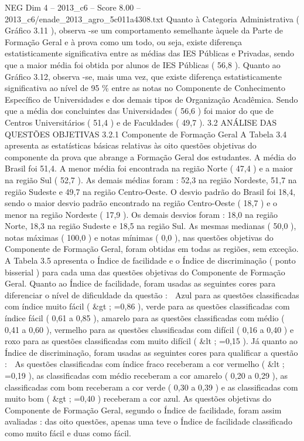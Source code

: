 \begin{textsample}{NEG Dim 4 – 2013\_c6 – Score 8.00 – 2013\_c6/enade\_2013\_agro\_5c011a4308.txt}
Quanto à Categoria Administrativa ( Gráfico 3.11 ), observa -se um comportamento semelhante àquele da Parte de Formação Geral e à prova como um todo, ou seja, existe diferença estatisticamente significativa entre as médias das IES Públicas e Privadas, sendo que a maior média foi obtida por alunos de IES Públicas ( 56,8 ).
Quanto ao Gráfico 3.12, observa -se, mais uma vez, que existe diferença estatisticamente significativa ao nível de 95 \% entre as notas no Componente de Conhecimento Específico de Universidades e dos demais tipos de Organização Acadêmica.
Sendo que a média dos concluintes das Universidades ( 56,6 ) foi maior do que de Centros Universitários ( 51,4 ) e de Faculdades ( 49,7 ). 3.2 ANÁLISE DAS QUESTÕES OBJETIVAS 3.2.1 Componente de Formação Geral A Tabela 3.4 apresenta as estatísticas básicas relativas às oito questões objetivas do componente da prova que abrange a Formação Geral dos estudantes.
A média do Brasil foi 51,4.
A menor média foi encontrada na região Norte ( 47,4 ) e a maior na região Sul ( 52,7 ).
As demais médias foram : 52,3 na região Nordeste, 51,7 na região Sudeste e 49,7 na região Centro-Oeste.
O desvio padrão do Brasil foi 18,4, sendo o maior desvio padrão encontrado na região Centro-Oeste ( 18,7 ) e o menor na região Nordeste ( 17,9 ).
Os demais desvios foram : 18,0 na região Norte, 18,3 na região Sudeste e 18,5 na região Sul.
As mesmas medianas ( 50,0 ), notas máximas ( 100,0 ) e notas mínimas ( 0,0 ), nas questões objetivas do Componente de Formação Geral, foram obtidas em todas as regiões, sem exceção.
A Tabela 3.5 apresenta o Índice de facilidade e o Índice de discriminação ( ponto bisserial ) para cada uma das questões objetivas do Componente de Formação Geral.
Quanto ao Índice de facilidade, foram usadas as seguintes cores para diferenciar o nível de dificuldade da questão :  Azul para as questões classificadas com índice muito fácil ( \&gt ; =0,86 ), verde para as questões classificadas com índice fácil ( 0,61 a 0,85 ), amarelo para as questões classificadas com médio ( 0,41 a 0,60 ), vermelho para as questões classificadas com difícil ( 0,16 a 0,40 ) e roxo para as questões classificadas com muito difícil ( \&lt ; =0,15 ).
Já quanto ao Índice de discriminação, foram usadas as seguintes cores para qualificar a questão :  As questões classificadas com índice fraco receberam a cor vermelho ( \&lt ; =0,19 ), as classificadas com médio receberam a cor amarelo ( 0,20 a 0,29 ), as classificadas com bom receberam a cor verde ( 0,30 a 0,39 ) e as classificadas com muito bom ( \&gt ; =0,40 ) receberam a cor azul.
As questões objetivas do Componente de Formação Geral, segundo o Índice de facilidade, foram assim avaliadas : das oito questões, apenas uma teve o Índice de facilidade classificado como muito fácil e duas como fácil.

\end{textsample}
